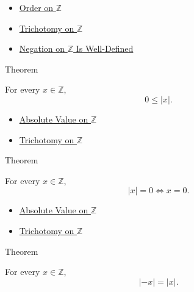\begin{dependencies}
\begin{itemize}
  \item \hyperref[def:order-on-z]{Order on $\mathbb{Z}$}
  \item \hyperref[thm:trichotomy-on-z]{Trichotomy on $\mathbb{Z}$}
  \item \hyperref[thm:negation-on-z-well-defined]{Negation on $\mathbb{Z}$ Is Well-Defined}
\end{itemize}
\end{dependencies}

\begin{theorembox}{Theorem}
\begin{theorem}
\label{thm:absolute-value-nonnegative-on-z}
For every $x\in\mathbb{Z}$,
\[
0\le |x|.
\]
\end{theorem}
\end{theorembox}

\begin{dependencies}
\begin{itemize}
  \item \hyperref[def:absolute-value-on-z]{Absolute Value on $\mathbb{Z}$}
  \item \hyperref[thm:trichotomy-on-z]{Trichotomy on $\mathbb{Z}$}
\end{itemize}
\end{dependencies}

\begin{theorembox}{Theorem}
\begin{theorem}
\label{thm:absolute-value-zero-iff-on-z}
For every $x\in\mathbb{Z}$,
\[
|x|=0 \Longleftrightarrow x=0.
\]
\end{theorem}
\end{theorembox}

\begin{dependencies}
\begin{itemize}
  \item \hyperref[def:absolute-value-on-z]{Absolute Value on $\mathbb{Z}$}
  \item \hyperref[thm:trichotomy-on-z]{Trichotomy on $\mathbb{Z}$}
\end{itemize}
\end{dependencies}

\begin{theorembox}{Theorem}
\begin{theorem}
\label{thm:absolute-value-negation-on-z}
For every $x\in\mathbb{Z}$,
\[
|-x|=|x|.
\]
\end{theorem}
\end{theorembox}

